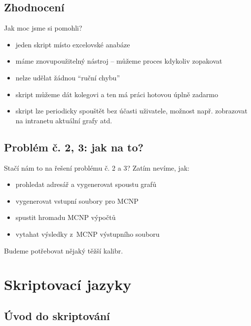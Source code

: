 \documentclass{beamer}
\begin{document}
\subsection{Zhodnocení}

\begin{frame}{Jak moc jsme si pomohli?}
  \begin{itemize}
    \item jeden skript místo excelovské anabáze
    \item máme znovupoužitelný nástroj -- můžeme proces kdykoliv zopakovat
    \item nelze udělat žádnou ``ruční chybu''
    \item skript můžeme dát kolegovi a ten má práci hotovou úplně zadarmo
    \item skript lze periodicky spouštět bez účasti uživatele, možnost např. zobrazovat na intranetu aktuální grafy atd.
  \end{itemize}
\end{frame}

\subsection{Problém č. 2, 3: jak na to?}

\begin{frame}{Stačí nám to na řešení problému č. 2 a 3?}
  Zatím nevíme, jak:
  \begin{itemize}
    \item prohledat adresář a vygenerovat spoustu grafů
  \end{itemize}
  \begin{itemize}
    \item vygenerovat vstupní soubory pro MCNP
    \item spustit hromadu MCNP výpočtů
    \item vytahat výsledky z~MCNP výstupního souboru
  \end{itemize}
  Budeme potřebovat nějaký těžší kalibr.
\end{frame}

\section{Skriptovací jazyky}

\subsection{Úvod do skriptování}
\end{document}
